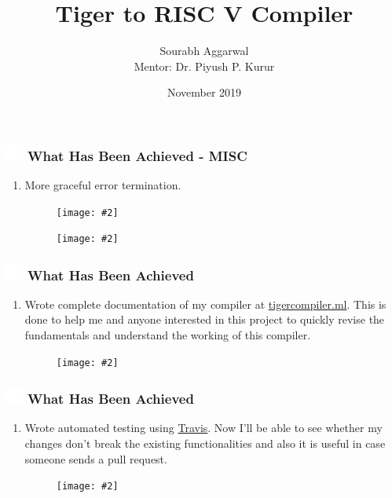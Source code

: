 \documentclass{beamer}
\title{Tiger to RISC V Compiler}
\author{Sourabh Aggarwal\\ Mentor: Dr. Piyush P. Kurur}
\institute[IIT Palakkad] %
{
  Department of Computer Science And Engineering\\
  IIT Palakkad
}
\date{November 2019}
\newcommand{\iph}[2]{
    \texttt{[image: \#2]}
}
\newcommand{\ft}[1]{
  \frametitle{\includegraphics[height=0.55cm, width=0.55cm, keepaspectratio]{assets/tiger.png} #1}
}
\newcounter{saveenumi}
\newcommand{\seti}{\setcounter{saveenumi}{\value{enumi}}}
\newcommand{\conti}{\setcounter{enumi}{\value{saveenumi}}}
\begin{document}
\begin{frame}
  \titlepage
\end{frame}

\begin{frame}[fragile]
  \ft{What Has Been Achieved - MISC}
  \begin{enumerate}
    \conti
    \item More graceful error termination.
    \begin{figure}
    \centering
    \iph{0.80}{assets/lexError.png}
    \label{fig:lexError}
    \end{figure}
    \begin{figure}
    \centering
    \iph{0.80}{assets/lexError3.png}
    \label{fig:lexError}
    \end{figure}
    \seti
  \end{enumerate}
\end{frame}

\begin{frame}[fragile]
  \ft{What Has Been Achieved}
  \begin{enumerate}
    \conti
    \item Wrote complete documentation of my compiler at \href{https://tigercompiler.ml}{tigercompiler.ml}. This is done to help me and anyone interested in this project to quickly revise the fundamentals and understand the working of this compiler.
    \begin{figure}
    \centering
    \iph{0.80}{assets/tigercompiler.png}
    \label{fig:tigercompiler}
    \end{figure}
    \seti
  \end{enumerate}
\end{frame}

\begin{frame}[fragile]
  \ft{What Has Been Achieved}
  \begin{enumerate}
    \conti
    \item Wrote automated testing using \href{https://travis-ci.org/sourabh2311/btp}{Travis}. Now I'll be able to see whether my changes don't break the existing functionalities and also it is useful in case someone sends a pull request.
    \begin{figure}
    \centering
    \iph{0.80}{assets/travis.png}
    \label{fig:travis}
    \end{figure}
    \seti
  \end{enumerate}
\end{frame}
\end{document}
